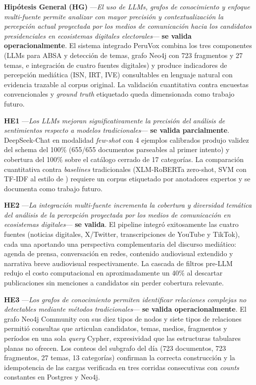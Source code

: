 \textbf{Hipótesis General (HG)} —\textit{El uso de LLMs, grafos de conocimiento
y enfoque multi-fuente permite analizar con mayor precisión y contextualización
la percepción actual proyectada por los medios de comunicación hacia los
candidatos presidenciales en ecosistemas digitales electorales}—
\textbf{se valida operacionalmente}. El sistema integrado PeruVox combina los
tres componentes (LLMs para ABSA y detección de temas, grafo Neo4j con 723
fragmentos y 27 temas, e integración de cuatro fuentes digitales) y produce
indicadores de percepción mediática (ISN, IRT, IVE) consultables en lenguaje
natural con evidencia trazable al corpus original. La validación cuantitativa
contra encuestas convencionales y \textit{ground truth} etiquetado queda
dimensionada como trabajo futuro.

\textbf{HE1} —\textit{Los LLMs mejoran significativamente la precisión del
análisis de sentimientos respecto a modelos tradicionales}—
\textbf{se valida parcialmente}. DeepSeek-Chat en modalidad \textit{few-shot}
con 4 ejemplos calibrados produjo validez del schema del 100\% (655/655
documentos parseables al primer intento) y cobertura del 100\% sobre el
catálogo cerrado de 17 categorías. La comparación cuantitativa contra
\textit{baselines} tradicionales (XLM-RoBERTa zero-shot, SVM con TF-IDF al
estilo de \cite{pr_alvi2023twitter_election_review}) requiere un corpus
etiquetado por anotadores expertos y se documenta como trabajo futuro.

\textbf{HE2} —\textit{La integración multi-fuente incrementa la cobertura y
diversidad temática del análisis de la percepción proyectada por los medios de
comunicación en ecosistemas digitales}— \textbf{se valida}. El pipeline integró
exitosamente las cuatro fuentes (noticias digitales, X/Twitter, transcripciones
de YouTube y TikTok), cada una aportando una perspectiva complementaria del
discurso mediático: agenda de prensa, conversación en redes, contenido
audiovisual extendido y narrativa breve audiovisual respectivamente. La cascada
de filtros pre-LLM redujo el costo computacional en aproximadamente un 40\% al
descartar publicaciones sin menciones a candidatos sin perder cobertura
relevante.

\textbf{HE3} —\textit{Los grafos de conocimiento permiten identificar relaciones
complejas no detectables mediante métodos tradicionales}— \textbf{se valida
operacionalmente}. El grafo Neo4j Community con sus diez tipos de nodos y siete
tipos de relaciones permitió consultas que articulan candidatos, temas, medios,
fragmentos y períodos en una sola \textit{query} Cypher, expresividad que las
estructuras tabulares planas no ofrecen. Los conteos del subgrafo del día
(723 documentos, 723 fragmentos, 27 temas, 13 categorías) confirman la correcta
construcción y la idempotencia de las cargas verificada en tres corridas
consecutivas con \textit{counts} constantes en Postgres y Neo4j.

